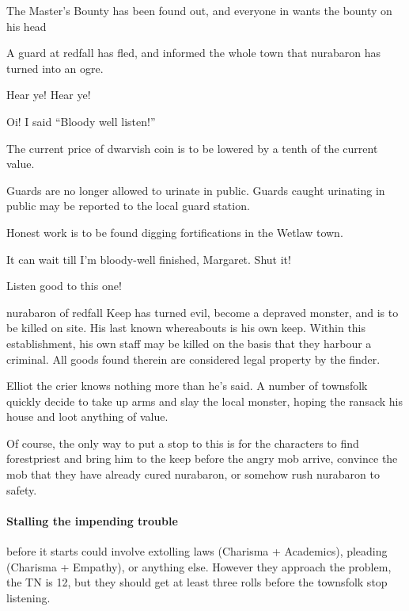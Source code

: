 \begin{multicols}{2}

{\N \N The Master's Bounty}%
{ has been found out, and everyone in  wants the bounty on his head}%

A guard at \gls{redfall} has fled, and informed the whole town that \gls{nurabaron} has turned into an ogre.

\begin{speechtext}

    Hear ye! Hear ye!

    Oi! I said ``Bloody well listen!''

    The current price of dwarvish coin is to be lowered by a tenth of the current value.

    Guards are no longer allowed to urinate in public.
    Guards caught urinating in public may be reported to the local guard station.

    Honest work is to be found digging fortifications in the Wetlaw town.

    It can wait till I'm bloody-well finished, Margaret.  Shut it!

    Listen good to this one!

    \gls{nurabaron} of \gls{redfall} Keep has turned evil, become a depraved monster, and is to be killed on site.  His last known whereabouts is his own keep.  Within this establishment, his own staff may be killed on the basis that they harbour a criminal.  All goods found therein are considered legal property by the finder.

\end{speechtext}

Elliot the crier knows nothing more than he's said.  A number of townsfolk quickly decide to take up arms and slay the local monster, hoping the ransack his house and loot anything of value.

Of course, the only way to put a stop to this is for the characters to find \gls{forestpriest} and bring him to the keep before the angry mob arrive, convince the mob that they have already cured \gls{nurabaron}, or somehow rush \gls{nurabaron} to safety.

\paragraph{Stalling the impending trouble}
before it starts could involve extolling laws (Charisma + Academics), pleading (Charisma + Empathy), or anything else.
However they approach the problem, the TN is 12, but they should get at least three rolls before the townsfolk stop listening.


\end{multicols}
